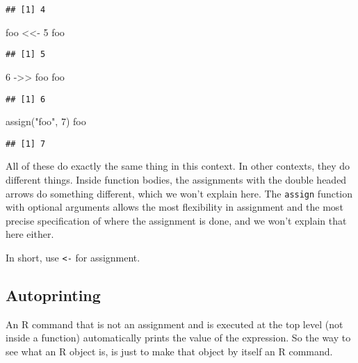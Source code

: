 \documentclass[
]{article}
\newenvironment{Shaded}{\begin{snugshade}}{\end{snugshade}}
\newcommand{\DecValTok}[1]{\textcolor[rgb]{0.00,0.00,0.81}{#1}}
\newcommand{\FunctionTok}[1]{\textcolor[rgb]{0.00,0.00,0.00}{#1}}
\newcommand{\NormalTok}[1]{#1}
\newcommand{\OtherTok}[1]{\textcolor[rgb]{0.56,0.35,0.01}{#1}}
\newcommand{\StringTok}[1]{\textcolor[rgb]{0.31,0.60,0.02}{#1}}
\begin{document}
\begin{verbatim}
## [1] 4
\end{verbatim}

\begin{Shaded}
\begin{Highlighting}[]
\NormalTok{foo }\OtherTok{\textless{}\textless{}{-}} \DecValTok{5}
\NormalTok{foo}
\end{Highlighting}
\end{Shaded}

\begin{verbatim}
## [1] 5
\end{verbatim}

\begin{Shaded}
\begin{Highlighting}[]
\DecValTok{6} \OtherTok{{-}\textgreater{}\textgreater{}}\NormalTok{ foo}
\NormalTok{foo}
\end{Highlighting}
\end{Shaded}

\begin{verbatim}
## [1] 6
\end{verbatim}

\begin{Shaded}
\begin{Highlighting}[]
\FunctionTok{assign}\NormalTok{(}\StringTok{"foo"}\NormalTok{, }\DecValTok{7}\NormalTok{)}
\NormalTok{foo}
\end{Highlighting}
\end{Shaded}

\begin{verbatim}
## [1] 7
\end{verbatim}

All of these do exactly the same thing in this context. In other
contexts, they do different things. Inside function bodies, the
assignments with the double headed arrows do something different, which
we won't explain here. The \texttt{assign} function with optional
arguments allows the most flexibility in assignment and the most precise
specification of where the assignment is done, and we won't explain that
here either.

In short, use \texttt{\textless{}-} for assignment.

\hypertarget{autoprinting}{%
\subsection{Autoprinting}\label{autoprinting}}

An R command that is not an assignment and is executed at the top level
(not inside a function) automatically prints the value of the
expression. So the way to see what an R object is, is just to make that
object by itself an R command.
\end{document}
